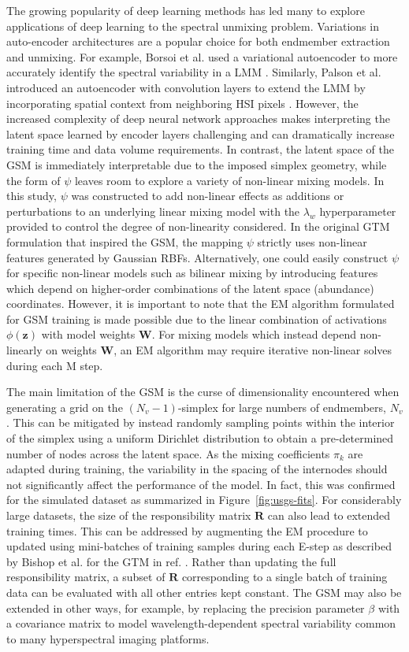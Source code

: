 The growing popularity of deep learning methods has led many to explore
applications of deep learning to the spectral unmixing problem. Variations in
auto-encoder architectures are a popular choice for both endmember extraction
and unmixing. For example, Borsoi et al. used a variational autoencoder to more
accurately identify the spectral variability in a LMM \cite{borsoi2019deep}.
Similarly, Palson et al. introduced an autoencoder with convolution layers to
extend the LMM by incorporating spatial context from neighboring HSI pixels
\cite{palsson2020convolutional}. However, the increased complexity of deep
neural network approaches makes interpreting the latent space learned by encoder
layers challenging and can dramatically increase training time and data volume
requirements. In contrast, the latent space of the GSM is immediately
interpretable due to the imposed simplex geometry, while the form of $\psi$
leaves room to explore a variety of non-linear mixing models. In this study,
$\psi$ was constructed to add non-linear effects as additions or perturbations
to an underlying linear mixing model with the $\lambda_w$ hyperparameter
provided to control the degree of non-linearity considered. In the original GTM
formulation that inspired the GSM, the mapping $\psi$ strictly uses non-linear
features generated by Gaussian RBFs. Alternatively, one could easily construct
$\psi$ for specific non-linear models such as bilinear mixing by introducing
features which depend on higher-order combinations of the latent space
(abundance) coordinates. However, it is important to note that the EM algorithm
formulated for GSM training is made possible due to the linear combination of
activations $\phi(\mathbf{z})$ with model weights $\mathbf{W}$. For mixing
models which instead depend non-linearly on weights $\mathbf{W}$, an EM
algorithm may require iterative non-linear solves during each M step.


The main limitation of the GSM is the curse of dimensionality encountered when
generating a grid on the $(N_v-1)$-simplex for large numbers of endmembers,
$N_v$. This can be mitigated by instead randomly sampling points within the
interior of the simplex using a uniform Dirichlet distribution to obtain a
pre-determined number of nodes across the latent space. As the mixing
coefficients $\pi_k$ are adapted during training, the variability in the spacing
of the internodes should not significantly affect the performance of the model.
In fact, this was confirmed for the simulated dataset as summarized in
Figure~\ref{fig:usgs-fits}. For considerably large datasets, the size of the
responsibility matrix $\mathbf{R}$ can also lead to extended training times.
This can be addressed by augmenting the EM procedure to updated using
mini-batches of training samples during each E-step as described by Bishop et
al. for the GTM in ref. \cite{gtm-developments}. Rather than updating the full
responsibility matrix, a subset of $\mathbf{R}$ corresponding to a single batch
of training data can be evaluated with all other entries kept constant. The GSM
may also be extended in other ways, for example, by replacing the precision
parameter $\beta$ with a covariance matrix to model wavelength-dependent
spectral variability common to many hyperspectral imaging platforms.



